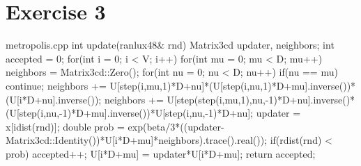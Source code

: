 \documentclass[11pt]{article}
\begin{document}
\maketitle

\section{Exercise 3}

\begin{code}{metropolis.cpp}
int update(ranlux48& rnd) {
        Matrix3cd updater, neighbors;
        int accepted = 0;
        for(int i = 0; i < V; i++) {
                for(int mu = 0; mu < D; mu++) {
                        neighbors = Matrix3cd::Zero();
                        for(int nu = 0; nu < D; nu++){
                                if(nu == mu) continue;
                                neighbors += U[step(i,mu,1)*D+nu]*(U[step(i,nu,1)*D+mu].inverse())*(U[i*D+nu].inverse());
                                neighbors += U[step(step(i,mu,1),nu,-1)*D+nu].inverse()*(U[step(i,nu,-1)*D+mu].inverse())*U[step(i,nu,-1)*D+nu];
                        }
                        updater = x[idist(rnd)];
                        double prob = exp(beta/3*((updater-Matrix3cd::Identity())*U[i*D+mu]*neighbors).trace().real());
                        if(rdist(rnd) < prob){
                                accepted++;
                                U[i*D+mu] = updater*U[i*D+mu];
                        }
                }
        }
        return accepted;
}
\end{code}
\end{document}
